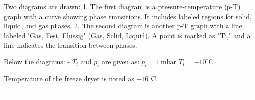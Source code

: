 Two diagrams are drawn:  
1. The first diagram is a pressure-temperature (p-T) graph with a curve showing phase transitions. It includes labeled regions for solid, liquid, and gas phases.  
2. The second diagram is another p-T graph with a line labeled "Gas, Fest, Flüssig" (Gas, Solid, Liquid). A point is marked as "Ti," and a line indicates the transition between phases.  

Below the diagrams:  
- \( T_i \) and \( p_i \) are given as:  
  \( p_i = 1 \, \text{mbar} \)  
  \( T_i = -10^\circ \text{C} \)  

Temperature of the freeze dryer is noted as \( -16^\circ \text{C} \).  

---